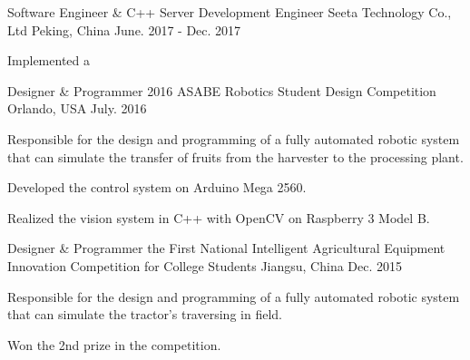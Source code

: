


\begin{cventries}


\cventry
{Software Engineer \& C++ Server Development Engineer} %
{Seeta Technology Co., Ltd} %
{Peking, China} %
{June. 2017 - Dec. 2017} %
{ %
\begin{cvitems}
\item {Implemented a }
\item {}
\item {}
\end{cvitems}
}


\cventry
{Designer \& Programmer} %
{2016 ASABE Robotics Student Design Competition} %
{Orlando, USA} %
{July. 2016} %
{ %
\begin{cvitems}
\item{Responsible for the design and programming of a fully automated robotic system that can simulate the transfer of fruits from the harvester to the processing plant.}
\item{Developed the control system on Arduino Mega 2560.}
\item{Realized the vision system in C++ with OpenCV on Raspberry 3 Model B.}
\end{cvitems}
}


\cventry
{Designer \& Programmer} %
{the First National Intelligent Agricultural Equipment Innovation Competition for College Students} %
{Jiangsu, China} %
{Dec. 2015} %
{ %
\begin{cvitems}
\item {Responsible for the design and programming of a fully automated robotic system that can simulate the tractor’s traversing in field.}
\item {Won the 2nd prize in the competition.}
\end{cvitems}
}


\end{cventries}
